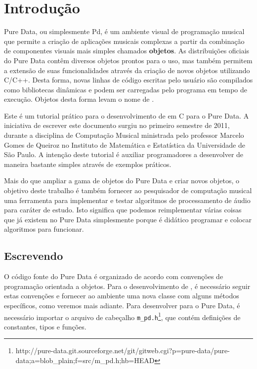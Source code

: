  
\chapter{Introdução}

Pure Data, ou simplesmente Pd, é um ambiente visual de programação musical que permite a criação de
aplicações musicais complexas a partir da combinação de componentes visuais
mais simples chamados \textbf{objetos}. As distribuições oficiais do Pure Data
contêm diversos objetos prontos para o uso, mas também permitem a extensão de
suas funcionalidades através da criação de novos objetos utilizando C/C++.
Desta forma, novas linhas de código escritas pelo usuário são compilados como
bibliotecas dinâmicas e podem ser carregadas pelo programa em tempo de
execução. Objetos desta forma levam o nome de \textbf{\externals}.

Este é um tutorial prático para o desenvolvimento de \externals em C para o
Pure Data. A iniciativa de escrever este documento surgiu no primeiro semestre
de 2011, durante a disciplina de Computação Musical ministrada pelo professor
Marcelo Gomes de Queiroz no Instituto de Matemática e Estatística da
Universidade de São Paulo. A intenção deste tutorial é auxiliar programadores
a desenvolver \externals de maneira bastante simples através de exemplos
práticos.

Mais do que ampliar a gama de objetos do Pure Data e criar novos objetos, o
objetivo deste trabalho é também fornecer ao pesquisador de computação musical
uma ferramenta para implementar e testar algoritmos de processamento de áudio
para caráter de estudo. Isto significa que podemos reimplementar várias coisas
que já existem no Pure Data simplesmente porque é didático programar e colocar
algoritmos para funcionar.

\section{Escrevendo \externals}

O código fonte do Pure Data é organizado de acordo com convenções de
programação orientada a objetos. Para o desenvolvimento de \externals, é
necessário seguir estas convenções e fornecer ao ambiente uma nova classe com
alguns métodos específicos, como veremos mais adiante. Para desenvolver para o
Pure Data, é necessário importar o arquivo de cabeçalho
\texttt{m\_pd.h}\footnote{http://pure-data.git.sourceforge.net/git/gitweb.cgi?p=pure-data/pure-data;a=blob\_plain;f=src/m\_pd.h;hb=HEAD},
que contém definições de constantes, tipos e funções.

